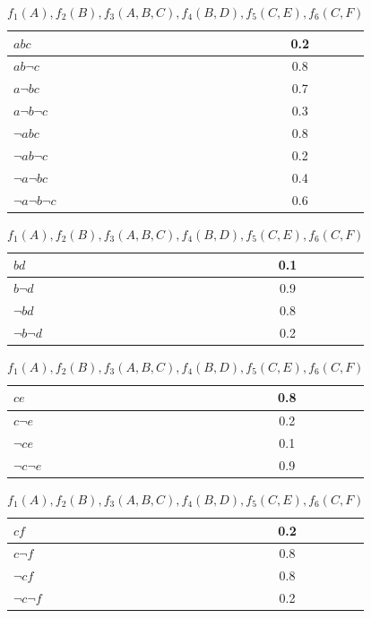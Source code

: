\documentclass[a4paper, 11pt]{article}
\begin{document}
\begin{enumerate}
\begin{table}[ht]
\begin{tabular}{|l|c|}
      \hline
      $abc$&0.2\\
      \hline
      $ab\lnot c$&0.8\\
      \hline
      $a\lnot bc$&0.7\\
      \hline
      $a\lnot b \lnot c$&0.3\\
      \hline
      $\lnot abc$&0.8\\
      \hline
      $\lnot ab\lnot c$&0.2\\
      \hline
      $\lnot a \lnot bc$&0.4\\
      \hline
      $\lnot a \lnot b \lnot c$&0.6\\
      \hline
    \end{tabular}
    \begin{tabular}{|l|c|}
      \hline
      $bd$&0.1\\
      \hline
      $b\lnot d$&0.9\\
      \hline
      $\lnot bd$&0.8\\
      \hline
      $\lnot b\lnot d$&0.2\\
      \hline
    \end{tabular}
    \begin{tabular}{|l|c|}
      \hline
      $ce$&0.8\\
      \hline
      $c\lnot e$&0.2\\
      \hline
      $\lnot ce$&0.1\\
      \hline
      $\lnot c\lnot e$&0.9\\
      \hline
    \end{tabular}
    \begin{tabular}{|l|c|}
      \hline
      $cf$&0.2\\
      \hline
      $c\lnot f$&0.8\\
      \hline
      $\lnot cf$&0.8\\
      \hline
      $\lnot c\lnot f$&0.2\\
      \hline
    \end{tabular}
    \caption{$f_{1}(A),f_{2}(B),f_{3}(A,B,C),f_{4}(B,D),f_{5}(C,E),f_{6}(C,F)$}

  \end{table}


\end{enumerate}
\end{document}
